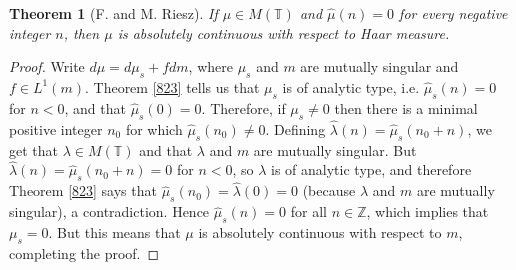 \documentclass{article}
\newtheorem{theorem}{Theorem}
\begin{document}
\begin{theorem}[F. and M. Riesz]
If $\mu \in M(\mathbb{T})$ and
$\hat{\mu}(n)=0$ for every negative integer $n$,
then $\mu$ is absolutely continuous with respect to Haar measure.
\end{theorem}
\begin{proof}
Write  $d\mu=d\mu_s + fdm$, where $\mu_s$ and $m$ are mutually singular and $f \in L^1(m)$. Theorem \ref{823}
tells us that $\mu_s$ is of analytic type, i.e. $\hat{\mu}_s(n)=0$ for $n<0$, and that $\hat{\mu}_s(0)=0$. Therefore,
if $\mu_s \neq 0$ then there is a minimal positive integer $n_0$ for which $\hat{\mu}_s(n_0) \neq 0$. Defining
$\hat{\lambda}(n)=\hat{\mu}_s(n_0+n)$, we get that $\lambda \in M(\mathbb{T})$ and that $\lambda$ and $m$ are mutually singular. But
$\hat{\lambda}(n)=\hat{\mu}_s(n_0+n)=0$ for $n<0$, so $\lambda$ is of analytic type, and therefore
 Theorem \ref{823} says that $\hat{\mu}_s(n_0)=\hat{\lambda}(0)=0$ (because $\lambda$ and $m$ are mutually singular), a contradiction. Hence
 $\hat{\mu}_s(n) = 0$ for all $n \in \mathbb{Z}$, which implies that $\mu_s=0$. But this means that $\mu$ is absolutely continuous with respect to $m$, completing the proof.
\end{proof}
\end{document}
